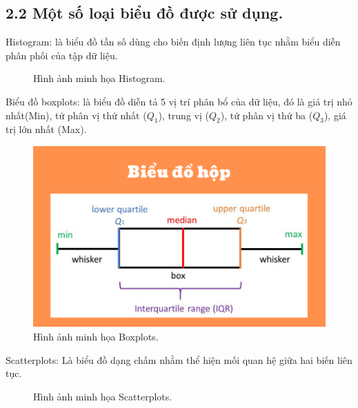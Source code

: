 \documentclass[a4paper]{article}
\newcommand{\gachdau}{\hspace*{1.5em}\ignorespaces}
\begin{document}
        \subsection*{2.2 Một số loại biểu đồ được sử dụng.}
            \gachdau 
            Histogram: là biểu đồ tần số dùng cho biến định lượng liên tục nhằm biểu diễn phân phối của tập dữ liệu.
            
            \begin{figure}[!h]
                \centering
                
                \caption{Hình ảnh minh họa Histogram.}
            \end{figure}
            
\newpage
            \hspace{1pt}
            Biểu đồ boxplots: là biểu đồ diễn tả 5 vị trí phân bổ của dữ liệu, đó là giá trị nhỏ nhất(Min), tứ phân vị thứ nhất ($Q_1$), trung vị ($Q_2$), tứ phân vị thứ ba ($Q_3$), giá trị lớn nhất (Max).
            \begin{figure}[H]
                \centering
                \includegraphics[width=0.8\linewidth]{2. Kiến Thức Nền/boxplot.png}
                \caption{Hình ảnh minh họa Boxplots.}
            \end{figure}
            \hspace{1pt}
            Scatterplots: Là biểu đồ dạng chấm nhằm thể hiện mối quan hệ giữa hai biến liên tục.
            \begin{figure}[H]
                \centering
                
                \caption{Hình ảnh minh họa Scatterplots.}
            \end{figure}

\newpage
\end{document}
